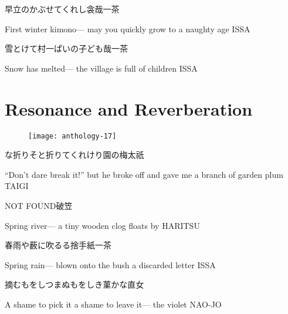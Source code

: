 \begin{haiku}
    {\FH 早立のかぶせてくれし衾哉}\hfill{\FH 一茶}

    \vin{} First winter kimono---
    \vin{} \vin{} may you quickly grow to
    \vin{} \vin{} \vin{} a naughty age \hspace{\fill} ISSA
\end{haiku}

\begin{haiku}
    {\FH 雪とけて村一ぱいの子ども哉}\hfill{\FH 一茶}

    \vin{} Snow has melted---
    \vin{} \vin{} the village is full
    \vin{} \vin{} \vin{} of children \hspace{\fill} ISSA
\end{haiku}

\chapter{Resonance and Reverberation}

\begin{figure}
    \texttt{[image: anthology-17]}
\end{figure}

\begin{haiku}
    {\FH な折りそと折りてくれけり園の梅}\hfill{\FH 太祇}

    \vin{} ``Don't dare break it!''
    \vin{} \vin{} but he broke off and gave me
    \vin{} \vin{} \vin{} a branch of garden plum \hspace{\fill} TAIGI
\end{haiku}

\begin{haiku}
    {NOT FOUND}\hfill{\FH 破笠}

    \vin{} Spring river---
    \vin{} \vin{} a tiny wooden clog
    \vin{} \vin{} \vin{} floats by \hspace{\fill} HARITSU
\end{haiku}

\begin{haiku}
    {\FH 春雨や薮に吹るる捨手紙}\hfill{\FH 一茶}

    \vin{} Spring rain---
    \vin{} \vin{} blown onto the bush
    \vin{} \vin{} \vin{} a discarded letter \hspace{\fill} ISSA
\end{haiku}

\begin{haiku}
    {\FH 摘むもをしつまぬもをしき菫かな}\hfill{\FH 直女}

    \vin{} A shame to pick it
    \vin{} \vin{} a shame to leave it---
    \vin{} \vin{} \vin{} the violet \hspace{\fill} NAO-JO
\end{haiku}

